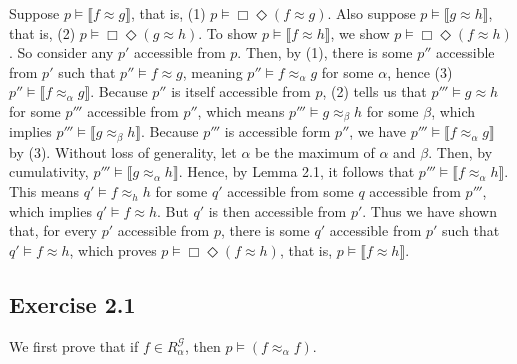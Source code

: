 \documentclass{article}
\newcommand{\lbc}{\llbracket}
\newcommand{\rbc}{\rrbracket}
\theoremstyle{definition}
\begin{document}
Suppose $p\vDash\lbc f\approx g\rbc$, that is, (1) $p\vDash\Box\Diamond (f\approx g)$. Also suppose 
$p\vDash\lbc g\approx h\rbc$, that is, (2) $p\vDash\Box\Diamond (g\approx h)$. To show 
$p\vDash\lbc f\approx h\rbc$, we show $p\vDash\Box\Diamond (f\approx h)$. So consider any $p'$ accessible from 
$p$. Then, by (1), there is some $p''$ accessible from $p'$ such that $p''\vDash f\approx g$, meaning 
$p''\vDash f\approx_\alpha g$ for some $\alpha$, hence (3) $p''\vDash\lbc f\approx_\alpha g\rbc$. 
Because $p''$ is itself accessible from $p$, 
(2) tells us that $p'''\vDash g\approx h$ for some $p'''$ accessible from $p''$, which means 
$p'''\vDash g\approx_\beta h$ for some $\beta$, which implies $p'''\vDash\lbc g\approx_\beta h\rbc$. 
Because $p'''$ is accessible form $p''$, we have 
$p'''\vDash\lbc f\approx_\alpha g\rbc$ by (3). Without loss of generality, let $\alpha$ be the maximum of 
$\alpha$ and $\beta$. Then, by cumulativity, $p'''\vDash \lbc g\approx_\alpha h\rbc$. Hence, by Lemma 2.1,
it follows that $p'''\vDash\lbc f\approx_\alpha h\rbc$. This means 
$q'\vDash f\approx_h h$ for some $q'$ accessible from some $q$ accessible from $p'''$, which 
implies $q'\vDash f\approx h$. But $q'$ is then 
accessible from $p'$. Thus we have shown that, for every $p'$ accessible from $p$, there is some 
$q'$ accessible from $p'$ such that $q'\vDash f\approx h$, which proves 
$p\vDash\Box\Diamond(f\approx h)$, that is, $p\vDash\lbc f\approx h\rbc$. 

\subsection*{Exercise 2.1}
We first prove that if $f\in R^\mathcal{G}_\alpha$, then $p\vDash (f\approx_\alpha f)$.
\end{document}

